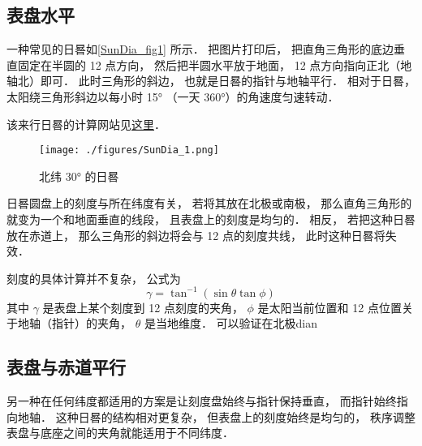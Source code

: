 
\begin{issues}
\issueDraft
\end{issues}

\subsection{表盘水平}
一种常见的日晷如\autoref{SunDia_fig1} 所示． 把图片打印后， 把直角三角形的底边垂直固定在半圆的 12 点方向， 然后把半圆水平放于地面， 12 点方向指向正北（地轴北）即可． 此时三角形的斜边， 也就是日晷的指针与地轴平行． 相对于日晷， 太阳绕三角形斜边以每小时 15° （一天 360°）的角速度匀速转动．

该来行日晷的计算网站见\href{https://www.blocklayer.com/sundial.aspx}{这里}．
\begin{figure}[ht]
\centering
\texttt{[image: ./figures/SunDia\_1.png]}
\caption{北纬 30° 的日晷} \label{SunDia_fig1}
\end{figure}

日晷圆盘上的刻度与所在纬度有关， 若将其放在北极或南极， 那么直角三角形的就变为一个和地面垂直的线段， 且表盘上的刻度是均匀的． 相反， 若把这种日晷放在赤道上， 那么三角形的斜边将会与 12 点的刻度共线， 此时这种日晷将失效．

刻度的具体计算并不复杂， 公式为
\begin{equation}
\gamma = \tan^{-1}(\sin\theta \tan \phi)
\end{equation}
其中 $\gamma$ 是表盘上某个刻度到 12 点刻度的夹角， $\phi$ 是太阳当前位置和 12 点位置关于地轴（指针）的夹角， $\theta$ 是当地维度． 可以验证在北极dian

\subsection{表盘与赤道平行}
另一种在任何纬度都适用的方案是让刻度盘始终与指针保持垂直， 而指针始终指向地轴． 这种日晷的结构相对更复杂， 但表盘上的刻度始终是均匀的， 秩序调整表盘与底座之间的夹角就能适用于不同纬度．
